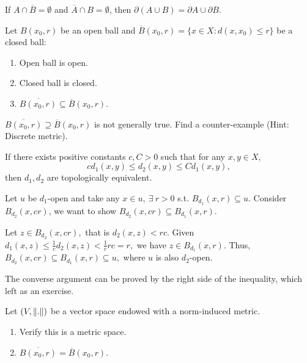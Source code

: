 \documentclass[12pt]{article}
\begin{document}
\begin{corollary}
If $A \cap \overline{B} = \emptyset$ and $\overline{A}\cap B= \emptyset$, 
then $\partial(A \cup B) = \partial A \cup \partial B$. 
\end{corollary}

\begin{theorem}
Let $B(x_0, r)$ be an open ball and $\overline{B}(x_0,r)=\{x\in X: d(x,x_0)\leq r\}$ be a closed ball:
\begin{enumerate}
    \item Open ball is open.
    \item Closed ball is closed.
    \item $\overline{B(x_0,r)}\subseteq\overline{B}(x_0,r)$.
\end{enumerate}    
\end{theorem}

\begin{exercise}
    $\overline{B(x_0,r)}\supseteq\overline{B}(x_0,r)$ is not generally true. Find a counter-example (Hint: Discrete metric).
\end{exercise}


\begin{theorem}
    If there exists positive constants $c,C>0$ such that for any $x, y\in X$,
    \[
    cd_1(x,y)\leq d_2(x,y)\leq Cd_1(x,y),
    \]
then $d_1, d_2$ are topologically equivalent.
\end{theorem}
\begin{pfbox}
Let $u$ be $d_1$-open and take any $x \in u,\ \exists\ r>0$ s.t. $B_{d_1}(x, r)\subseteq u.$ Consider $B_{d_2}(x,cr)$, we want to show $B_{d_2}(x,cr)\subseteq B_{d_1}(x, r).$

Let $z \in B_{d_2}(x,cr),$ that is $d_2(x,z)<rc$. Given $d_1(x,z)\leq \frac{1}{c}d_2(x,z)<\frac{1}{c}rc=r,$ we have $z \in  B_{d_1}(x, r).$ Thus, $B_{d_2}(x,cr)\subseteq B_{d_1}(x, r)\subseteq u,$ where $u$ is also $d_2$-open.

The converse argument can be proved by the right side of the inequality, which left as an exercise. 
\end{pfbox}


\begin{theorem}
    Let $(V,\left\lVert . \right\rVert)$ be a vector space endowed with a norm-induced metric.
    \begin{enumerate}
        \item Verify this is a metric space.
        \item $\overline{B(x_0,r)}=\overline{B}(x_0,r)$.
    \end{enumerate}
\end{theorem}
\end{document}
